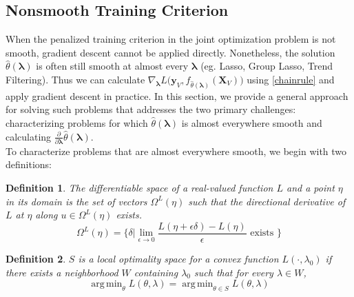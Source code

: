 \documentclass[10pt,letterpaper]{article}
\newtheorem{definition}{Definition}
\DeclareMathOperator*{\argmin}{arg\,min}
\begin{document}
\subsection{Nonsmooth Training Criterion}
When the penalized training criterion in the joint optimization problem is not smooth, gradient descent cannot be applied directly. Nonetheless, the solution $\hat{\theta}\left(\boldsymbol{\lambda}\right)$ is often still smooth at almost every $\boldsymbol{\lambda}$ (eg. Lasso, Group Lasso, Trend Filtering). Thus we can calculate $\nabla_{\boldsymbol{\lambda}} L \Big( \boldsymbol{y}_V, f_{\hat{\theta}(\boldsymbol{\lambda})}(\boldsymbol{X}_V) \Big )$ using \eqref{chainrule} and apply gradient descent in practice. In this section, we provide a general approach for solving such problems that addresses the two primary challenges: characterizing problems for which $\hat{\theta}\left(\boldsymbol{\lambda}\right)$ is almost everywhere smooth and calculating $\frac{\partial}{\partial \boldsymbol{\lambda}} \hat{\theta}(\boldsymbol{\lambda})$.\\

\vspace{2mm}
To characterize problems that are almost everywhere smooth, we begin with two definitions:
\begin{definition}
The differentiable space of a real-valued function $L$ and a point $\eta$ in its domain is the set of vectors $\Omega^{L}(\eta)$ such that the directional derivative of $L$ at $\eta$ along $u \in \Omega^{L}(\eta)$ exists.
\begin{equation}
\Omega^{L}(\eta) = \Big\{ \delta | \lim_{\epsilon \rightarrow 0} \frac{L(\eta + \epsilon \delta) - L(\eta)}{\epsilon} \text{ exists } \Big\}
\end{equation}
\end{definition}

\begin{definition}
$S$ is a local optimality space for a convex function $L(\cdot, \lambda_0)$ if there exists a neighborhood $W$ containing $\lambda_0$ such that for every $\lambda \in W$,
\begin{equation}
\argmin_\theta L(\theta, \lambda) = \argmin_{\theta \in S} L(\theta, \lambda)
\end{equation}
\end{definition}
\end{document}
